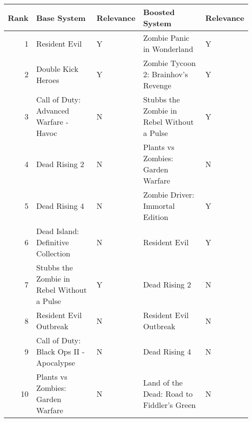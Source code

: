 \begin{tabular}{rllll}
\toprule
 Rank &                                Base System & Relevance &                             Boosted System & Relevance \\
\midrule
    1 &                              Resident Evil &         Y &                 Zombie Panic in Wonderland &         Y \\
    2 &                         Double Kick Heroes &         Y &        Zombie Tycoon 2: Brainhov's Revenge &         Y \\
    3 &     Call of Duty: Advanced Warfare - Havoc &         N & Stubbs the Zombie in Rebel Without a Pulse &         Y \\
    4 &                              Dead Rising 2 &         N &          Plants vs Zombies: Garden Warfare &         N \\
    5 &                              Dead Rising 4 &         N &            Zombie Driver: Immortal Edition &         Y \\
    6 &         Dead Island: Definitive Collection &         N &                              Resident Evil &         Y \\
    7 & Stubbs the Zombie in Rebel Without a Pulse &         Y &                              Dead Rising 2 &         N \\
    8 &                     Resident Evil Outbreak &         N &                     Resident Evil Outbreak &         N \\
    9 &    Call of Duty: Black Ops II - Apocalypse &         N &                              Dead Rising 4 &         N \\
   10 &          Plants vs Zombies: Garden Warfare &         N &  Land of the Dead: Road to Fiddler's Green &         N \\
\bottomrule
\end{tabular}
